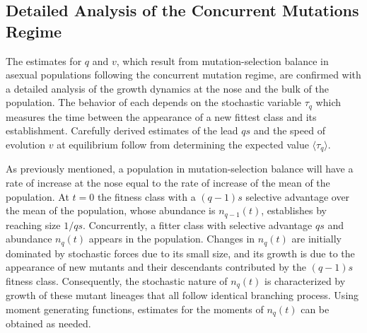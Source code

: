 \documentclass[12pt]{article}
\begin{document}
\subsection*{Detailed Analysis of the Concurrent Mutations Regime}
The estimates for $q$ and $v$, which result from mutation-selection balance in asexual populations following the concurrent mutation regime, are confirmed with a detailed analysis of the growth dynamics at the nose and the bulk of the population.  The behavior of each depends on the stochastic variable $\tau_q$ which measures the time between the appearance of a new fittest class and its establishment.  Carefully derived estimates of the lead $qs$ and the speed of evolution $v$ at equilibrium follow from determining the expected value $\langle \tau_q \rangle$.   

As previously mentioned, a population in mutation-selection balance will have a rate of increase at the nose equal to the rate of increase of the mean of the population.  At $t=0$ the fitness class with a $(q-1)s$ selective advantage over the mean of the population, whose abundance is $n_{q-1}(t)$, establishes by reaching size $1/qs$.  Concurrently, a fitter class with selective advantage $qs$ and abundance $n_q(t)$ appears in the population.  Changes in $n_q(t)$ are initially dominated by stochastic forces due to its small size, and its growth is due to the appearance of new mutants and their descendants contributed by the $(q-1)s$ fitness class. Consequently, the stochastic nature of $n_q(t)$ is characterized by growth of these mutant lineages that all follow identical branching process.  Using moment generating functions, estimates for the moments of $n_q(t)$ can be obtained as needed.
\end{document}
